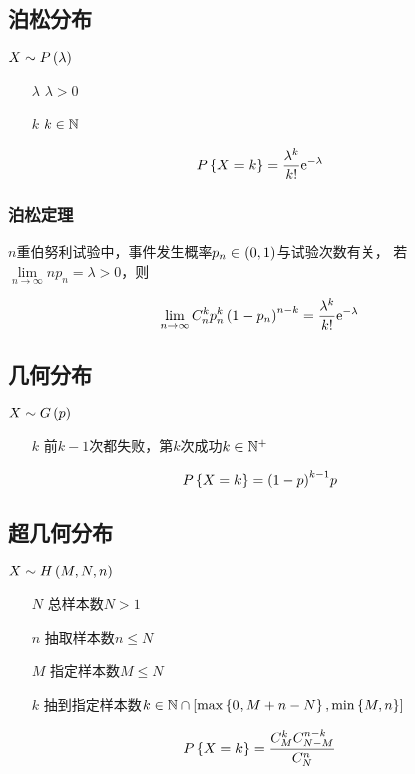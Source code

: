 \documentclass{article}
\begin{document}
\subsection{泊松分布}

$X\sim P\left(\lambda\right)$

\begin{enumerate}
    \item [$\lambda$] $\lambda>0$
    \item [$k$] $k\in\mathbb N$
\end{enumerate}

\[P\left\{X=k\right\}=\frac{\lambda^k}{k!}\mathrm e^{-\lambda}\]

\subsubsection{泊松定理}

$n$重伯努利试验中，事件发生概率$p_n\in\left(0,1\right)$与试验次数有关，
若$\lim\limits_{n\to\infty}np_n=\lambda>0$，则

\[\lim_{n\to\infty}C_n^kp_n^k\left(1-p_n\right)^{n-k}
    =\dfrac{\lambda^k}{k!}\mathrm e^{-\lambda}\]

\subsection{几何分布}

$X\sim G\left(p\right)$

\begin{enumerate}
    \item [$k$] 前$k-1$次都失败，第$k$次成功$k\in\mathbb N^+$
\end{enumerate}

\[P\left\{X=k\right\}={\left(1-p\right)}^{k-1}p\]

\subsection{超几何分布}

$X\sim H\left(M,N,n\right)$

\begin{enumerate}
    \item [$N$] 总样本数$N>1$
    \item [$n$] 抽取样本数$n\leqslant N$
    \item [$M$] 指定样本数$M\leqslant N$
    \item [$k$] 抽到指定样本数$k\in\mathbb N\cap\left[\max\left\{0,M+n-N\right\},\min\left\{M,n\right\}\right]$
\end{enumerate}

\[P\left\{X=k\right\}=\frac{C_M^kC_{N-M}^{n-k}}{C_N^n}\]
\end{document}

